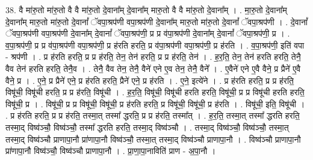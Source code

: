 \documentclass[17pt]{extarticle}
\begin{document}
38. वै मा॑रु॒तो मा॑रु॒तो वै वै मा॑रु॒तो दे॒वाना᳚म् दे॒वाना᳚म् मारु॒तो वै वै मा॑रु॒तो दे॒वाना᳚म् । . मा॒रु॒तो दे॒वाना᳚म् दे॒वाना᳚म् मारु॒तो मा॑रु॒तो दे॒वानां᳚ ॅवपा॒श्रप॑णी वपा॒श्रप॑णी दे॒वाना᳚म् मारु॒तो मा॑रु॒तो दे॒वानां᳚ ॅवपा॒श्रप॑णी । . दे॒वानां᳚ ॅवपा॒श्रप॑णी वपा॒श्रप॑णी दे॒वाना᳚म् दे॒वानां᳚ ॅवपा॒श्रप॑णी॒ प्र प्र व॑पा॒श्रप॑णी दे॒वाना᳚म् दे॒वानां᳚ ॅवपा॒श्रप॑णी॒ प्र । . व॒पा॒श्रप॑णी॒ प्र प्र व॑पा॒श्रप॑णी वपा॒श्रप॑णी॒ प्र ह॑रति हरति॒ प्र व॑पा॒श्रप॑णी वपा॒श्रप॑णी॒ प्र ह॑रति । . व॒पा॒श्रप॑णी॒ इति॑ वपा - श्रप॑णी । . प्र ह॑रति हरति॒ प्र प्र ह॑रति॒ तेन॒ तेन॑ हरति॒ प्र प्र ह॑रति॒ तेन॑ । . ह॒र॒ति॒ तेन॒ तेन॑ हरति हरति॒ तेनै॒ वैव तेन॑ हरति हरति॒ तेनै॒व । . तेनै॒ वैव तेन॒ तेनै॒ वैने॑ एने ए॒व तेन॒ तेनै॒ वैने᳚ । . ए॒वैने॑ एने ए॒वै वैने॒ प्र प्रैने॑ ए॒वै वैने॒ प्र । . ए॒ने॒ प्र प्रैने॑ एने॒ प्र ह॑रति हरति॒ प्रैने॑ एने॒ प्र ह॑रति । . ए॒ने॒ इत्ये॑ने । . प्र ह॑रति हरति॒ प्र प्र ह॑रति॒ विषू॑ची॒ विषू॑ची हरति॒ प्र प्र ह॑रति॒ विषू॑ची । . ह॒र॒ति॒ विषू॑ची॒ विषू॑ची हरति हरति॒ विषू॑ची॒ प्र प्र विषू॑ची हरति हरति॒ विषू॑ची॒ प्र । . विषू॑ची॒ प्र प्र विषू॑ची॒ विषू॑ची॒ प्र ह॑रति हरति॒ प्र विषू॑ची॒ विषू॑ची॒ प्र ह॑रति । . विषू॑ची॒ इति॒ विषू॑ची । . प्र ह॑रति हरति॒ प्र प्र ह॑रति॒ तस्मा॒त् तस्मा᳚ द्धरति॒ प्र प्र ह॑रति॒ तस्मा᳚त् । . ह॒र॒ति॒ तस्मा॒त् तस्मा᳚ द्धरति हरति॒ तस्मा॒द् विष्व॑ञ्चौ॒ विष्व॑ञ्चौ॒ तस्मा᳚ द्धरति हरति॒ तस्मा॒द् विष्व॑ञ्चौ । . तस्मा॒द् विष्व॑ञ्चौ॒ विष्व॑ञ्चौ॒ तस्मा॒त् तस्मा॒द् विष्व॑ञ्चौ प्राणापा॒नौ प्रा॑णापा॒नौ विष्व॑ञ्चौ॒ तस्मा॒त् तस्मा॒द् विष्व॑ञ्चौ प्राणापा॒नौ । . विष्व॑ञ्चौ प्राणापा॒नौ प्रा॑णापा॒नौ विष्व॑ञ्चौ॒ विष्व॑ञ्चौ प्राणापा॒नौ । . प्रा॒णा॒पा॒नाविति॑ प्राण - अ॒पा॒नौ । \newline
\pagebreak
{}
\end{document}
